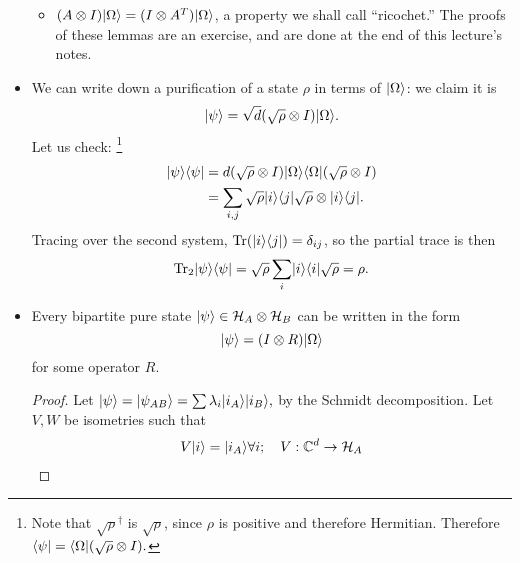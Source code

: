 \begin{itemize}
\begin{itemize}
        \item $(A\otimes I)\lvert\Omega\rangle=(I\otimes A^T)\lvert\Omega\rangle$, a property we shall call ``ricochet.'' The proofs of these lemmas are an exercise, and are done at the end of this lecture's notes.
    \end{itemize}
    \item We can write down a purification of a state $\rho$ in terms of $\lvert\Omega\rangle$: we claim it is
    \begin{equation}
        \lvert\psi\rangle=\sqrt{d}(\sqrt{\rho}\otimes I) \lvert\Omega\rangle.
    \end{equation}
    Let us check:%
        \footnote{Note that $\sqrt{\rho}^\dagger$ is $\sqrt{\rho}$, since $\rho$ is positive and therefore Hermitian. Therefore $\langle\psi\rvert=\langle\Omega\rvert (\sqrt{\rho}\otimes I).$}
    \begin{align*}
        \lvert\psi\rangle\langle\psi\rvert&=d(\sqrt{\rho} \otimes I) \lvert\Omega\rangle\langle\Omega\rvert (\sqrt{\rho}\otimes I)\\
            &= \sum_{i,j}\sqrt{\rho}\lvert i\rangle\langle j\rvert\sqrt{\rho} \otimes \lvert i\rangle\langle j\rvert.
    \end{align*}
    Tracing over the second system, $\operatorname{Tr}(\lvert i\rangle\langle j\rvert)=\delta_{ij}$, so the partial trace is then
    \begin{equation}
        \operatorname{Tr}_2 \lvert\psi\rangle\langle\psi\rvert = \sqrt{\rho} \sum_i \lvert i\rangle\langle i\rvert \sqrt{\rho} = \rho.
    \end{equation}
    \item Every bipartite pure state $\lvert\psi\rangle\in \mathcal H_A \otimes \mathcal H_B$ can be written in the form
    \begin{equation}\label{bipartitedecomp}
        \lvert\psi\rangle=(I\otimes R) \lvert\Omega\rangle
    \end{equation}
    for some operator $R$.
    \begin{proof}
        Let $\lvert\psi\rangle=\lvert\psi_{AB}\rangle=\sum \lambda_i \lvert i_A\rangle\lvert i_B\rangle,$ by the Schmidt decomposition. Let $V,W$ be isometries such that
        \begin{gather}
            V\ket{i}=\ket{i_A}\forall i ; \quad V:\CC^d \to \cH_A\\

\end{gather}
\end{proof}
\end{itemize}
